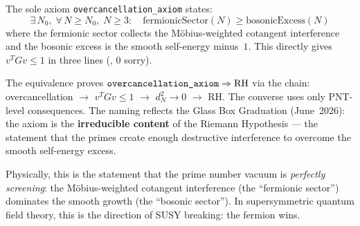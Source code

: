 \begin{remark}
The sole axiom \texttt{overcancellation\_axiom} states:
\[
  \exists\, N_0,\; \forall\, N \geq N_0,\; N \geq 3:\quad
  \text{fermionicSector}(N) \geq \text{bosonicExcess}(N)
\]
where the fermionic sector collects the Möbius-weighted cotangent
interference and the bosonic excess is the smooth self-energy minus~$1$.
This directly gives $v^T G v \leq 1$ in three lines
(, 0 sorry).

The equivalence  proves
$\texttt{overcancellation\_axiom} \Rightarrow \mathrm{RH}$
via the chain: overcancellation $\to$ $v^T G v \leq 1$ $\to$
$d_N^2 \to 0$ $\to$ RH. The converse uses only PNT-level consequences.
The naming reflects the Glass Box Graduation (June~2026):
the axiom is the \textbf{irreducible content} of the Riemann Hypothesis ---
the statement that the primes create enough destructive interference
to overcome the smooth self-energy excess.

Physically, this is the statement that the prime number vacuum is
\emph{perfectly screening}: the Möbius-weighted cotangent interference
(the ``fermionic sector'') dominates the smooth growth
(the ``bosonic sector''). In supersymmetric quantum field theory,
this is the direction of SUSY breaking: the fermion wins.
\end{remark}

